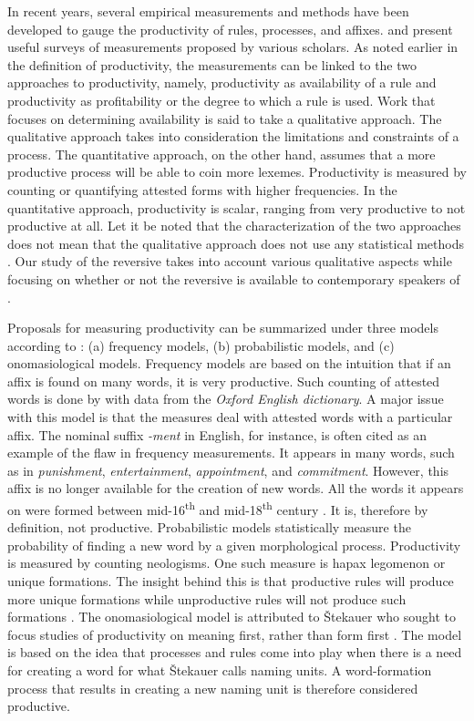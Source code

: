 \documentclass[output=paper]{langsci/langscibook}
\begin{document}
In recent years, several empirical measurements and methods have been developed to gauge the productivity of rules, processes, and affixes. \citet[143-161]{Bauer2001} and \citet{Fernandez-Dominguezetal2007} present useful surveys of measurements proposed by various scholars. As noted earlier in the definition of productivity, the measurements can be linked to the two approaches to productivity, namely, productivity as availability of a rule and productivity as profitability or the degree to which a rule is used. Work that focuses on determining availability is said to take a qualitative approach. The qualitative approach  takes into consideration the limitations and constraints of a process. The quantitative approach, on the other hand, assumes that a more productive process will be able to coin more lexemes. Productivity is measured by counting or quantifying attested forms with higher frequencies. In the quantitative approach, productivity is scalar, ranging from very productive to not productive at all. Let it be noted that the characterization of the two approaches does not mean that the qualitative approach does not use any statistical methods \citep[434-437]{Fernandez-Dominguez2013}. Our study of the reversive takes into account various qualitative aspects while focusing on whether or not the reversive is available to contemporary speakers of . 

Proposals for measuring productivity can be summarized under three models according to \citet[35]{Fernandez-Dominguezetal2007}: 
(a) frequency models, 
(b) probabilistic models, and 
(c) onomasiological models. Frequency models are based on the intuition that if an affix is found on many words, it is very productive. Such counting of attested words is done by \citet{Plag1999} with data from the \textit{Oxford English dictionary}. A major issue with this model is that the measures deal with attested words with a particular affix. The nominal suffix \textit{-ment} in English, for instance, is often cited as an example of the flaw in frequency measurements. It appears in many words, such as in \textit{punishment}, \textit{entertainment}, \textit{appointment}, and \textit{commitment}. However, this affix is no longer available for the creation of new words. All the words it appears on were formed between mid-16\textsuperscript{th} and mid-18\textsuperscript{th} century \citep[181]{Bauer2001}. It is, therefore by definition, not productive. Probabilistic models statistically measure the probability of finding a new word by a given morphological process. Productivity is measured by counting neologisms. One such measure is hapax legomenon or unique formations. The insight behind this is that productive rules will produce more unique formations while unproductive rules will not produce such formations \citep{Baayen1992}. The onomasiological model is attributed to \v{S}tekauer who sought to focus studies of productivity on meaning first, rather than form first \citep{Stekauer2005}. The model is based on the idea that processes and rules come into play when there is a need for creating a word  for what \v{S}tekauer calls naming units. A word-formation process that results in creating a new naming unit is therefore considered productive. 
\end{document}
